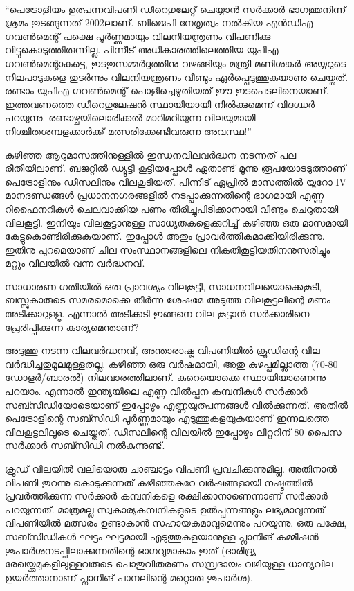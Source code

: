 \vskip 2pt

‌\begin{framed}
``പെട്രോളിയം ഉത്പന്നവിപണി ഡീറെഗുലേറ്റ് ചെയ്യാന്‍ സര്‍ക്കാര്‍ ഭാഗത്തുനിന്ന് ശ്രമം തുടങ്ങുന്നത് 2002ലാണ്. 
ബിജെപി നേതൃത്വം നല്‍കിയ എന്‍ഡിഎ ഗവണ്‍മെന്റ് പക്ഷെ പൂര്‍ണ്ണമായും വിലനിയന്ത്രണം വിപണിക്കു 
വിട്ടുകൊടുത്തിരുന്നില്ല. പിന്നീട് അധികാരത്തിലെത്തിയ യുപിഎ ഗവണ്‍മെന്റാകട്ടെ, ഇടതുസമ്മര്‍ദ്ദത്തിനു വഴങ്ങിയും 
മന്ത്രി മണിശങ്കര്‍ അയ്യറുടെ നിലപാടുകളെ തുടര്‍ന്നും വിലനിയന്ത്രണം വീണ്ടും ഏര്‍പ്പെടുത്തുകയാണു ചെയ്തത്. രണ്ടാം 
യുപിഎ ഗവണ്‍മെന്റ് പൊളിച്ചെഴുതിയത് ഈ ഇടപെടലിനെയാണ്. ഇത്തവണത്തെ ഡീറെഗുലേഷന്‍ സ്ഥായിയായി
നില്‍ക്കുമെന്ന് വിദഗ്ദ്ധര്‍ പറയുന്നു. രണ്ടാഴ്ചയിലൊരിക്കല്‍ മാറിമറിയുന്ന വിലയുമായി നിശ്ചിതശമ്പളക്കാര്‍ക്ക് 
മത്സരിക്കേണ്ടിവരുന്ന അവസ്ഥ!''
\end{framed}

{\vskip 12pt}


കഴിഞ്ഞ ആറുമാസത്തിനുള്ളില്‍ ഇന്ധനവിലവര്‍ദ്ധന നടന്നത് പല രീതിയിലാണ്. ബജറ്റില്‍ ഡ്യൂട്ടി കൂട്ടിയപ്പോള്‍ 
ഏതാണ്ട് മൂന്നു രൂപയോടടുത്താണ് പെട്രോളിനും ഡീസലിനും വിലകൂടിയത്. പിന്നീട് ഏപ്രില്‍ മാസത്തില്‍ യൂറോ IV 
മാനദണ്ഡങ്ങള്‍ പ്രധാനനഗരങ്ങളില്‍ നടപ്പാക്കുന്നതിന്റെ ഭാഗമായി എണ്ണ റിഫൈനറികള്‍ ചെലവാക്കിയ പണം 
തിരിച്ചുപിടിക്കാനായി വീണ്ടും ചെറുതായി വിലകൂട്ടി. ഇനിയും വിലകൂട്ടാനുള്ള സാധ്യതകളെക്കുറിച്ച് കഴിഞ്ഞ ഒരു മാസമായി
കേട്ടുകൊണ്ടിരിക്കുകയാണ്. ഇപ്പോള്‍ അതും പ്രാവര്‍ത്തികമാക്കിയിരിക്കുന്നു. ഇതിനു പുറമെയാണ് ചില സംസ്ഥാനങ്ങളിലെ
നികുതികൂട്ടിയതിനനുസരിച്ചും മറ്റും വിലയില്‍ വന്ന വര്‍ദ്ധനവ്.

സാധാരണ ഗതിയില്‍ ഒരു പ്രാവശ്യം വിലകൂട്ടി, സാധനവിലയൊക്കെകൂടി, ബസ്സുകാരുടെ സമരമൊക്കെ തീര്‍ന്ന 
ശേഷമേ അടുത്ത വിലകൂട്ടലിന്റെ മണം അടിക്കാറുള്ളൂ. എന്നാല്‍ അടിക്കടി ഇങ്ങനെ വില കൂട്ടാന്‍ സര്‍ക്കാരിനെ 
പ്രേരിപ്പിക്കുന്ന കാര്യമെന്താണ്?

അടുത്തു നടന്ന വിലവര്‍ദ്ധനവ്, അന്താരാഷ്ട്ര വിപണിയില്‍ ക്രൂഡിന്റെ വില വര്‍ദ്ധിച്ചതുമൂലമുള്ളതല്ല. കഴിഞ്ഞ ഒരു 
വര്‍ഷമായി, അതു കുഴപ്പമില്ലാത്ത (70-80 ഡോളര്‍/ബാരല്‍) നിലവാരത്തിലാണ്. കുറെയൊക്കെ സ്ഥായിയാണെന്നു
പറയാം. എന്നാല്‍ ഇന്ത്യയിലെ എണ്ണ വില്‍പ്പന കമ്പനികള്‍ സര്‍ക്കാര്‍ സബ്സിഡിയോടെയാണ് ഇപ്പോഴും 
എണ്ണയുത്പന്നങ്ങള്‍ വില്‍ക്കുന്നത്. അതില്‍ പെട്രോളിന്റെ സബ്സിഡി പൂര്‍ണ്ണമായും എടുത്തുകളയുകയാണ് 
ഇന്നലത്തെ വിലകൂട്ടലിലൂടെ ചെയ്തത്. ഡീസലിന്റെ വിലയില്‍ ഇപ്പോഴും ലിറ്ററിന് 80 പൈസ സര്‍ക്കാര്‍ 
സബ്സിഡി നല്‍കുന്നുണ്ട്.

ക്രൂഡ് വിലയില്‍ വലിയൊരു ചാഞ്ചാട്ടം വിപണി പ്രവചിക്കുന്നുമില്ല. അതിനാല്‍ വിപണി തുറന്നു കൊടുക്കുന്നത് 
കഴിഞ്ഞകുറേ വര്‍ഷങ്ങളായി നഷ്ടത്തില്‍ പ്രവര്‍ത്തിക്കുന്ന സര്‍ക്കാര്‍ കമ്പനികളെ രക്ഷിക്കാനാണെന്നാണ് സര്‍ക്കാര്‍ 
പറയുന്നത്. മാത്രമല്ല സ്വകാര്യകമ്പനികളുടെ ഉല്‍പ്പന്നങ്ങളും ലഭ്യമാവുന്നത് വിപണിയില്‍ മത്സരം ഉണ്ടാകാന്‍ 
സഹായകമാവുമെന്നും പറയുന്നു. ഒരു പക്ഷേ, സബ്സിഡികള്‍ ഘട്ടം ഘട്ടമായി എടുത്തുകളയാനുള്ള പ്ലാനിങ് 
കമ്മീഷന്‍ ശുപാര്‍ശനടപ്പിലാക്കുന്നതിന്റെ ഭാഗവുമാകാം ഇത് (ദാരിദ്ര്യ രേഖയ്ക്കുമുകളിലുള്ളവരുടെ പൊതുവിതരണം 
സമ്പ്രദായം വഴിയുള്ള ധാന്യവില ഉയര്‍ത്താനാണ് പ്ലാനിങ് പാനലിന്റെ മറ്റൊരു ശുപാര്‍ശ).

